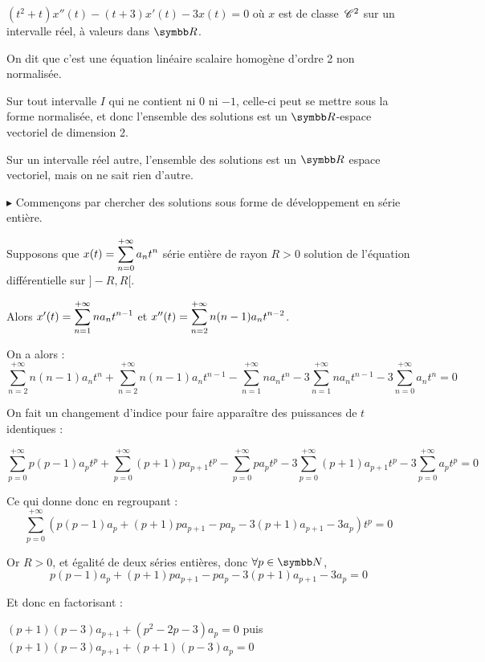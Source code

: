 \begin{exemple}
    $(t^2 + t) x''(t) - (t + 3) x'(t) - 3x(t) = 0$ où $x$ est de classe 
    $\,\mathscr C^{2}$ sur un intervalle réel, à valeurs dans $\R$.

    On dit que c'est une équation linéaire scalaire homogène d'ordre 2 non normalisée. 

    Sur tout intervalle $I$ qui ne contient ni $0$ ni $-1$, celle-ci peut se mettre sous 
    la forme normalisée, et donc l'ensemble des solutions est un $\R$-espace vectoriel
    de dimension 2.

    Sur un intervalle réel autre, l'ensemble des solutions est un $\R$ espace vectoriel, mais 
    on ne sait rien d'autre. 

    \avspace $\blacktriangleright$ Commençons par chercher des solutions sous forme de 
    développement en série entière. 


    \svspace Supposons que $x(t) = \displaystyle \sum_{n = 0}^{+ \infty} a_n t^n$ série entière de rayon 
    $R > 0$ solution de l'équation différentielle sur $]-R, R[$.

    Alors $x'(t) = \displaystyle \sum_{n = 1}^{+ \infty} n a_n t^{n - 1}$ et $x''(t) = \displaystyle \sum_{n = 2}^{+ \infty} n (n - 1) a_n t^{n - 2}$.

    On a alors : 
    $$\sum_{n = 2}^{+ \infty} n(n - 1) a_n t^n + \sum_{n = 2}^{+ \infty} n(n - 1) a_n t^{n - 1} - \sum_{n = 1}^{+ \infty} n a_n t^n - 3 \sum_{n = 1}^{+ \infty} n a_n t^{n - 1} - 3 \sum_{n = 0}^{+ \infty} a_n t^n = 0$$

    On fait un changement d'indice pour faire apparaître des puissances de $t$ identiques :

    $$\sum_{p = 0}^{+ \infty} p(p - 1) a_p t^p + \sum_{p = 0}^{+ \infty} (p + 1) p a_{p + 1} t^p - \sum_{p = 0}^{+ \infty} p a_p t^p - 3 \sum_{p = 0}^{+ \infty} (p + 1) a_{p + 1} t^p - 3 \sum_{p = 0}^{+ \infty} a_p t^p = 0$$

    Ce qui donne donc en regroupant : 
    $$\sum_{p = 0}^{+ \infty} \left( p(p - 1) a_p + (p + 1) p a_{p + 1} - p a_p - 3 (p + 1) a_{p + 1} - 3 a_p \right) t^p = 0$$

    Or $R > 0$, et égalité de deux séries entières, donc $\forall p \in \N$, 
    $$p(p - 1) a_p + (p + 1) p a_{p + 1} - p a_p - 3 (p + 1) a_{p + 1} - 3 a_p = 0$$

    Et donc en factorisant : 

    $(p + 1)(p - 3) a_{p + 1} + (p^2 -2p - 3) a_p = 0$ puis 
    $(p + 1)(p - 3) a_{p + 1} + (p + 1)(p - 3) a_p = 0$


\end{exemple}
